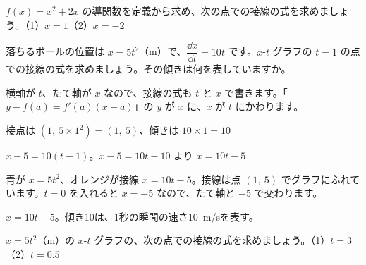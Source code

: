 \begin{jibun}
$f(x)=x^2+2x$ の導関数を定義から求め、次の点での接線の式を求めましょう。\quad（1）$x=1$\quad（2）$x=-2$
\end{jibun}

\begin{reidai}[$x$-$t$ グラフの接線]
落ちるボールの位置は $x=5t^2$（m）で、$\dfrac{\dd x}{\dd t}=10t$ です。$x$-$t$ グラフの $t=1$ の点での接線の式を求めましょう。その傾きは何を表していますか。\par
\kangaekata 横軸が $t$、たて軸が $x$ なので、接線の式も $t$ と $x$ で書きます。「$y-f(a)=f'(a)(x-a)$」の $y$ が $x$ に、$x$ が $t$ にかわります。\par
\shiki 接点は $(1,\ 5\times1^2)=(1,\ 5)$、傾きは $10\times1=10$\par
\hspace*{2.6\zw}$x-5=10(t-1)$。$x-5=10t-10$ より $x=10t-5$\par
\noindent\begin{minipage}[c]{0.5\linewidth}
\end{minipage}\hfill
\begin{minipage}[c]{0.46\linewidth}\raggedright
青が $x=5t^2$、オレンジが接線 $x=10t-5$。接線は点 $(1,\ 5)$ でグラフにふれています。$t=0$ を入れると $x=-5$ なので、たて軸と $-5$ で交わります。
\end{minipage}\par
\kotae $x=10t-5$。傾き10は、1秒の瞬間の速さ\qty{10}{m/s}を表す。
\end{reidai}

\begin{jibun}
$x=5t^2$（m）の $x$-$t$ グラフの、次の点での接線の式を求めましょう。\quad（1）$t=3$\quad（2）$t=0.5$
\end{jibun}


